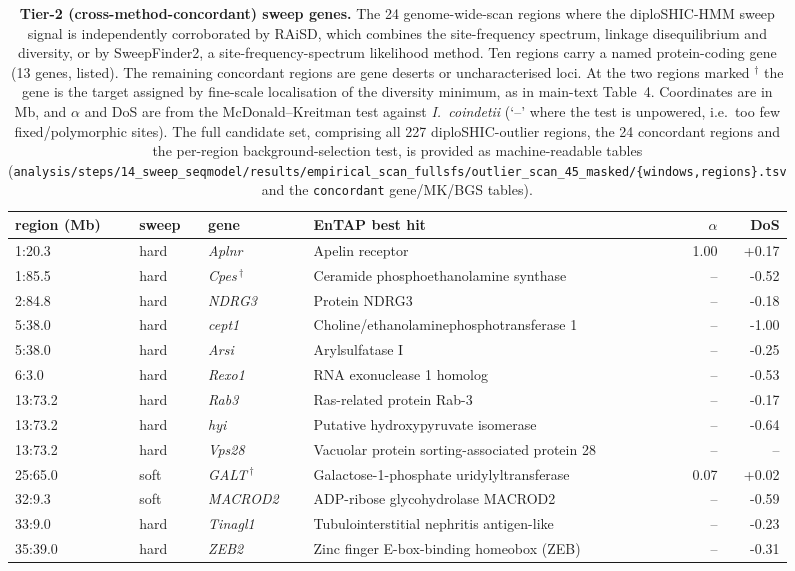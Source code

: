 \documentclass[11pt]{article}
\begin{document}
\begin{table}[h]\centering
  \caption{\textbf{Tier-2 (cross-method-concordant) sweep genes.} The 24 genome-wide-scan regions where
    the diploSHIC-HMM sweep signal is independently corroborated by RAiSD, which combines the site-frequency spectrum, linkage disequilibrium and diversity, or by SweepFinder2, a site-frequency-spectrum likelihood method. Ten regions carry a named protein-coding gene (13 genes, listed). The remaining
    concordant regions are gene deserts or uncharacterised loci. At the two regions marked $^{\dagger}$ the gene is the
    target assigned by fine-scale localisation of the diversity minimum, as in main-text Table~4. Coordinates are in Mb, and $\alpha$ and DoS are from
    the McDonald--Kreitman test against \textit{I.~coindetii} (`--' where the test is unpowered, i.e.\ too
    few fixed/polymorphic sites). The full candidate set, comprising all 227 diploSHIC-outlier regions, the 24 concordant regions
    and the per-region background-selection test, is provided as machine-readable tables
    (\texttt{analysis/steps/14\_sweep\_seqmodel/results/empirical\_scan\_fullsfs/\allowbreak outlier\_scan\_45\_masked/\{windows,regions\}.tsv} and the \texttt{concordant} gene/MK/BGS tables).}
  \label{stab:candidates}
  \begin{tabular}{llllrr}
    \toprule
    region (Mb) & sweep & gene & EnTAP best hit & $\alpha$ & DoS \\
    \midrule
    1:20.3 & hard & \textit{Aplnr} & Apelin receptor & 1.00 & +0.17 \\
    1:85.5 & hard & \textit{Cpes}\,$^{\dagger}$ & Ceramide phosphoethanolamine synthase & -- & -0.52 \\
    2:84.8 & hard & \textit{NDRG3} & Protein NDRG3 & -- & -0.18 \\
    5:38.0 & hard & \textit{cept1} & Choline/ethanolaminephosphotransferase 1 & -- & -1.00 \\
    5:38.0 & hard & \textit{Arsi} & Arylsulfatase I & -- & -0.25 \\
    6:3.0 & hard & \textit{Rexo1} & RNA exonuclease 1 homolog & -- & -0.53 \\
    13:73.2 & hard & \textit{Rab3} & Ras-related protein Rab-3 & -- & -0.17 \\
    13:73.2 & hard & \textit{hyi} & Putative hydroxypyruvate isomerase & -- & -0.64 \\
    13:73.2 & hard & \textit{Vps28} & Vacuolar protein sorting-associated protein 28 & -- & -- \\
    25:65.0 & soft & \textit{GALT}\,$^{\dagger}$ & Galactose-1-phosphate uridylyltransferase & 0.07 & +0.02 \\
    32:9.3 & soft & \textit{MACROD2} & ADP-ribose glycohydrolase MACROD2 & -- & -0.59 \\
    33:9.0 & hard & \textit{Tinagl1} & Tubulointerstitial nephritis antigen-like & -- & -0.23 \\
    35:39.0 & hard & \textit{ZEB2} & Zinc finger E-box-binding homeobox (ZEB) & -- & -0.31 \\
    \bottomrule
  \end{tabular}
\end{table}
\end{document}
